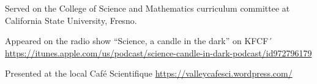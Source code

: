 \documentclass[10pt]{article}
\begin{document}
\spcp
Served on the College of Science and Mathematics curriculum committee at\\
California State University, Fresno.

\spcp
Appeared on the radio show ``Science, a candle in the dark'' on KFCF´
\url{https://itunes.apple.com/us/podcast/science-candle-in-dark-podcast/id972796179}

\spcp
Presented at the local Caf\'e Scientifique
\url{https://valleycafesci.wordpress.com/}




%
\end{document}
